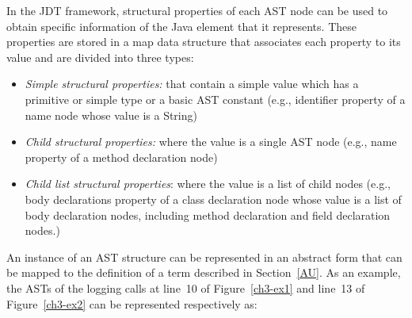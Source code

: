 In the JDT framework, structural properties of each AST node can be used to obtain specific information of the Java element that it represents. These properties are stored in a map data structure that associates each property to its value and are divided into three types:
\begin{itemize} [leftmargin=0.7in]
\item \textit{Simple structural properties:} that contain a simple value which has a primitive or simple type or a basic AST constant (e.g., identifier property of a name node whose value is a String)
\item \textit{Child structural properties:} where the value is a single AST node (e.g., name property of a method declaration node)
\item \textit{Child list structural properties}: where the value is a list of child nodes (e.g., body declarations property of a class declaration node whose value is a list of body declaration nodes, including method declaration and field declaration nodes.)
\end{itemize}
An instance of an AST structure can be represented in an abstract form that can be mapped to the definition of a term described in Section~\ref{AU}. As an example, the ASTs of the logging calls at line~10 of Figure~\ref{ch3-ex1} and line~13 of Figure~\ref{ch3-ex2} can be represented respectively as:
